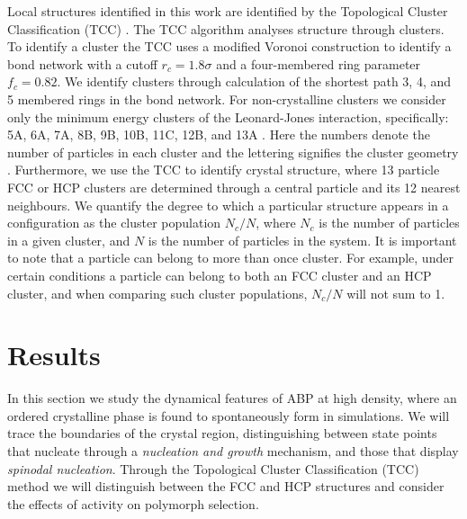 Local structures identified in this work are identified by the Topological Cluster Classification (TCC) \cite{malins2013}. The TCC algorithm analyses structure through clusters. To identify a cluster the TCC uses a modified Voronoi construction to identify a bond network with a cutoff $r_c=1.8\sigma$ and a four-membered ring parameter $f_c=0.82$.  We identify clusters through calculation of the shortest path 3, 4, and 5 membered rings in the bond network. 
For non-crystalline clusters we consider only the minimum energy clusters of the Leonard-Jones interaction, specifically: 5A, 6A, 7A, 8B, 9B, 10B, 11C, 12B, and 13A \cite{taffs2010}. Here the numbers denote the number of particles in each cluster and the lettering signifies the cluster geometry \cite{doye1995}.  
Furthermore, we use the TCC to identify crystal structure, where 13 particle FCC or HCP clusters are determined through a central particle and its 12 nearest neighbours.
We quantify the degree to which a particular structure appears in a configuration as the cluster population $N_c/N$, where $N_c$ is the number of particles in a given cluster, and $N$ is the number of particles in the system. It is important to note that a particle can belong to more than once cluster. For example, under certain conditions a particle can belong to both an FCC cluster and an HCP cluster, and when comparing such cluster populations, $N_c/N$ will not sum to 1. 




\section{Results}
\label{sectionResults}


In this section we study the dynamical features of ABP %
at high density, %
where an ordered crystalline phase is found to spontaneously form in simulations. We will trace the boundaries of the crystal region, distinguishing between state points that nucleate through a \emph{nucleation and growth} mechanism, and those that display \emph{spinodal nucleation}. Through the Topological Cluster Classification (TCC) method we will distinguish between the FCC and HCP structures and consider the effects of activity on polymorph selection.




